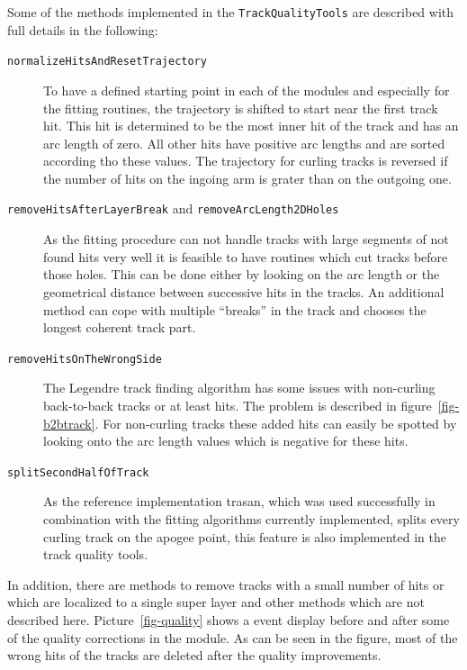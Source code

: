 Some of the methods implemented in the \texttt{TrackQualityTools} are described with full details in the following:
\begin{description}
 \item[\texttt{normalizeHitsAndResetTrajectory}] To have a defined starting point in each of the modules and especially for the fitting routines, the trajectory is shifted to start near the first track hit. This hit is determined to be the most inner hit of the track and has an arc length of zero. All other hits have positive arc lengths and are sorted according tho these values. The trajectory for curling tracks is reversed if the number of hits on the ingoing arm is grater than on the outgoing one.
 \item[\texttt{removeHitsAfterLayerBreak} and \texttt{removeArcLength2DHoles}]  As the fitting procedure can not handle tracks with large segments of not found hits very well it is feasible to have routines which cut tracks before those holes. This can be done either by looking on the arc length or the geometrical distance between successive hits in the tracks. An additional method can cope with multiple ``breaks'' in the track and chooses the longest coherent track part.
 \item[\texttt{removeHitsOnTheWrongSide}] The Legendre track finding algorithm has some issues with non-curling back-to-back tracks or at least hits. The problem is described in figure~\ref{fig-b2btrack}. For non-curling tracks these added hits can easily be spotted by looking onto the arc length values which is negative for these hits.
 \item[\texttt{splitSecondHalfOfTrack}] As the reference implementation trasan, which was used successfully in combination with the fitting algorithms currently implemented, splits every curling track on the apogee point, this feature is also implemented in the track quality tools.
\end{description}
In addition, there are methods to remove tracks with a small number of hits or which are localized to a single super layer and other methods which are not described here. Picture~\ref{fig-quality} shows a event display before and after some of the quality corrections in the module. As can be seen in the figure, most of the wrong hits of the tracks are deleted after the quality improvements.

